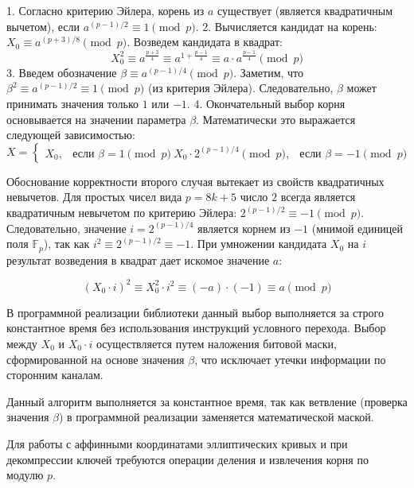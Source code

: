 1. Согласно критерию Эйлера, корень из $a$ существует (является квадратичным вычетом), если $a^{(p-1)/2} \equiv 1 \pmod p$.
2. Вычисляется кандидат на корень: $X_0 \equiv a^{(p+3)/8} \pmod p$. Возведем кандидата в квадрат:
\begin{equation}
    X_0^2 \equiv a^{\frac{p+3}{4}} \equiv a^{1 + \frac{p-1}{4}} \equiv a \cdot a^{\frac{p-1}{4}} \pmod p
\end{equation}
3. Введем обозначение $\beta \equiv a^{(p-1)/4} \pmod p$. Заметим, что $\beta^2 \equiv a^{(p-1)/2} \equiv 1 \pmod p$ (из критерия Эйлера). Следовательно, $\beta$ может принимать значения только $1$ или $-1$.
4. Окончательный выбор корня основывается на значении параметра $\beta$.
Математически это выражается следующей зависимостью:
\begin{equation}
X = \begin{cases}
X_0, & \text{если } \beta = 1 \pmod p \
X_0 \cdot 2^{(p-1)/4} \pmod p, & \text{если } \beta = -1 \pmod p
\end{cases}
\end{equation}

Обоснование корректности второго случая вытекает из свойств квадратичных невычетов. 
Для простых чисел вида $p = 8k + 5$ число $2$ всегда является квадратичным невычетом по критерию Эйлера: $2^{(p-1)/2} \equiv -1 \pmod p$. 
Следовательно, значение $i = 2^{(p-1)/4}$ является корнем из $-1$ (мнимой единицей поля $\mathbb{F}_p$), так как $i^2 \equiv 2^{(p-1)/2} \equiv -1$.
 При умножении кандидата $X_0$ на $i$ результат возведения в квадрат дает искомое значение $a$:

\begin{equation}
    (X_0 \cdot i)^2 \equiv X_0^2 \cdot i^2 \equiv (-a) \cdot (-1) \equiv a \pmod p
\end{equation}

В программной реализации библиотеки данный выбор выполняется за строго константное время без использования инструкций условного перехода. Выбор между $X_0$ и $X_0 \cdot i$ осуществляется путем наложения битовой маски, сформированной на основе значения $\beta$, что исключает утечки информации по сторонним каналам.

Данный алгоритм выполняется за константное время, так как ветвление (проверка значения $\beta$) в программной реализации заменяется математической маской.


Для работы с аффинными координатами эллиптических кривых и при декомпрессии ключей требуются операции деления и извлечения корня по модулю $p$.

